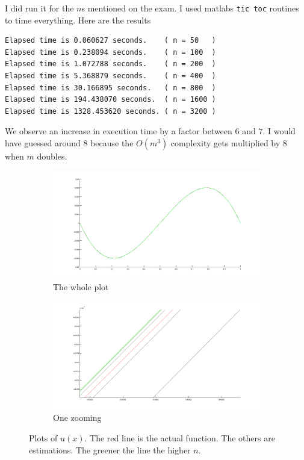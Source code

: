 \documentclass[a4paper,11pt]{article}
\begin{document}
I did run it for the $n$s mentioned on the exam. I used matlabs
\texttt{tic toc} routines to time everything. Here are the results

\begin{lstlisting}
Elapsed time is 0.060627 seconds.    ( n = 50   )
Elapsed time is 0.238094 seconds.    ( n = 100  )
Elapsed time is 1.072788 seconds.    ( n = 200  )
Elapsed time is 5.368879 seconds.    ( n = 400  )
Elapsed time is 30.166895 seconds.   ( n = 800  )
Elapsed time is 194.438070 seconds.  ( n = 1600 )
Elapsed time is 1328.453620 seconds. ( n = 3200 )
\end{lstlisting}

We observe an increase in execution time by a factor between $6$ and
$7$. I would have guessed around $8$ because the $O(m^3)$ complexity
gets multiplied by $8$ when $m$ doubles.

\begin{figure}
        \begin{subfigure}[b]{1.0\textwidth}
          \includegraphics[width=\textwidth]{fig/all.png}
          \caption{The whole plot}\label{fig:wholeplot}
        \end{subfigure}

        \begin{subfigure}[b]{1.0\textwidth}
          \includegraphics[width=\textwidth]{fig/azoom.png}
          \caption{One zooming}\label{fig:zooming}
        \end{subfigure}
        \caption{Plots of $u(x)$. The red line is the actual function.
        The others are estimations. The greener the line the higher
      $n$.}\label{fig:plots}
\end{figure}
\end{document}
